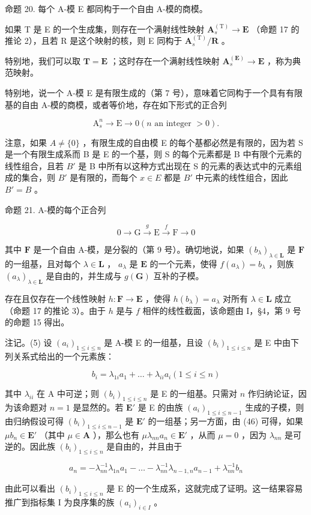 命题 20. 每个 A-模 E 都同构于一个自由 A-模的商模。

如果 T 是 E 的一个生成集，则存在一个满射线性映射 \(\mathbf{A}_{s}^{(\mathrm{T})}\to\mathbf{E}\) （命题 17 的推论 2），且若 R 是这个映射的核，则 E 同构于 \(\mathbf{A}_{s}^{(\mathrm{T})}/\mathbf{R}\) 。

特别地，我们可以取 \(\mathbf{T} = \mathbf{E}\) ；这时存在一个满射线性映射 \(\mathbf{A}_s^{(\mathbf{E})} \to \mathbf{E}\) ，称为典范映射。

特别地，说一个 A-模 E 是有限生成的（第 7 号），意味着它同构于一个具有有限基的自由 A-模的商模，或者等价地，存在如下形式的正合列

\[
\mathrm{A} _ {s} ^ {n} \rightarrow \mathrm{E} \rightarrow 0 (n \text {   an   integer   } > 0).
\]

注意，如果 \(A \neq \{0\}\) ，有限生成的自由模 E 的每个基都必然是有限的，因为若 S 是一个有限生成系而 B 是 E 的一个基，则 S 的每个元素都是 B 中有限个元素的线性组合，且若 \(B'\) 是 B 中所有以这种方式出现在 S 的元素的表达式中的元素组成的集合，则 \(B'\) 是有限的，而每个 \(x \in E\) 都是 \(B'\) 中元素的线性组合，因此 \(B' = B\) 。

命题 21. A-模的每个正合列

\[
0 \longrightarrow \mathrm{G} \stackrel {g} {\longrightarrow} \mathrm{E} \stackrel {f} {\longrightarrow} \mathrm{F} \longrightarrow 0
\]

其中 \(\mathbf{F}\) 是一个自由 A-模，是分裂的（第 9 号）。确切地说，如果 \((b_{\lambda})_{\lambda \in \mathbf{L}}\) 是 \(\mathbf{F}\) 的一组基，且对每个 \(\lambda \in \mathbf{L}\) ， \(a_{\lambda}\) 是 \(\mathbf{E}\) 的一个元素，使得 \(f(a_{\lambda}) = b_{\lambda}\) ，则族 \((a_{\lambda})_{\lambda \in \mathbf{L}}\) 是自由的，并生成与 \(g(\mathbf{G})\) 互补的子模。

存在且仅存在一个线性映射 \(h: \mathbf{F} \to \mathbf{E}\) ，使得 \(h(b_{\lambda}) = a_{\lambda}\) 对所有 \(\lambda \in \mathbf{L}\) 成立（命题 17 的推论 3）。由于 \(h\) 是与 \(f\) 相伴的线性截面，该命题由 I，§4，第 9 号的命题 15 得出。

注记。(5) 设 \((a_{i})_{1\leqslant i\leqslant n}\) 是 A-模 E 的一组基，且设 \((b_{i})_{1\leqslant i\leqslant n}\) 是 E 中由下列关系式给出的一个元素族：

\[
b _ {i} = \lambda_ {1 i} a _ {1} + \dots + \lambda_ {i i} a _ {i} (1 \leqslant i \leqslant n)\tag{46}
\]

其中 \(\lambda_{ii}\) 在 A 中可逆；则 \((b_i)_{1\leqslant i\leqslant n}\) 是 E 的一组基。只需对 \(n\) 作归纳论证，因为该命题对 \(n = 1\) 是显然的。若 \(\mathbf{E}'\) 是 E 的由族 \((a_i)_{1\leqslant i\leqslant n - 1}\) 生成的子模，则由归纳假设可得 \((b_i)_{1\leqslant i\leqslant n - 1}\) 是 \(\mathbf{E}'\) 的一组基；另一方面，由 (46) 可得，如果 \(\mu b_n\in \mathbf{E}'\) （其中 \(\mu \in \mathbf{A}\) ），那么也有 \(\mu \lambda_{nn}a_n\in \mathbf{E}'\) ，从而 \(\mu = 0\) ，因为 \(\lambda_{nn}\) 是可逆的。因此族 \((b_i)_{1\leqslant i\leqslant n}\) 是自由的，并且由于

\[
a _ {n} = - \lambda_ {n n} ^ {- 1} \lambda_ {1 n} a _ {1} - \dots - \lambda_ {n n} ^ {- 1} \lambda_ {n - 1, n} a _ {n - 1} + \lambda_ {n n} ^ {- 1} b _ {n}
\]

由此可以看出 \((b_{i})_{1\leqslant i\leqslant n}\) 是 E 的一个生成系，这就完成了证明。这一结果容易推广到指标集 I 为良序集的族 \((a_{i})_{i\in I}\) 。
